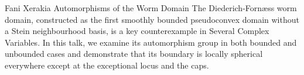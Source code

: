 \talk
{%
    Fani Xerakia
}
{%
    Automorphisms of the Worm Domain
}
{%
    The Diederich-Fornæss worm domain, constructed as the first
    smoothly bounded pseudoconvex domain without a Stein
    neighbourhood basis, is a key counterexample in Several
    Complex Variables. In this talk, we examine its automorphism
    group in both bounded and unbounded cases and demonstrate that
    its boundary is locally spherical everywhere except at the
    exceptional locus and the caps.
}
